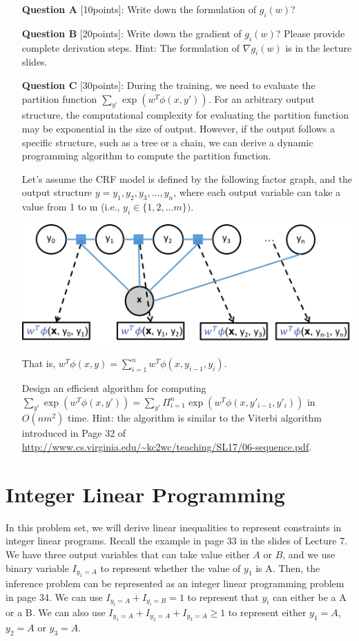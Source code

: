 \begin{itemize}
\item[{\bf Question A}][10points]: Write down the formulation of $g_i(w)$?

\item[ {\bf Question B}][20points]: Write down the gradient of  $g_i(w)$? Please provide complete derivation steps. Hint: The formulation of $\nabla g_i(w)$ is in the lecture slides.



\item[{\bf Question C}][30points]: During the training, we need to evaluate the partition function $\sum_{y'} \exp(w^T\phi(x,y'))$. For an arbitrary output structure, the computational complexity for evaluating the partition function may be exponential in the size of output. However, if the output follows a specific structure, such as a tree or a chain, we can derive a dynamic programming algorithm to compute the partition function.  

Let's assume the CRF model is defined by the following factor graph, and the output structure 
$y=y_1, y_2, y_3, \ldots, y_n$, where each output variable can take a value from 1 to m (i.e., $y_i\in \{1,2,\ldots m\})$.

\includegraphics[width=0.8\linewidth]{factor}

That is, $w^T \phi(x,y) = \sum_{i=1}^{n} w^T\phi(x,y_{i-1}, y_i)$.

Design an efficient algorithm for computing $\sum_{y'} \exp(w^T\phi(x,y')) = \sum_{y'} \Pi_{i=1}^{n} \exp(w^T \phi(x, y'_{i-1}, y'_i))$ in $O(nm^2)$ time. Hint: the algorithm is similar to the Viterbi algorithm introduced in Page 32 of \url{http://www.cs.virginia.edu/~kc2wc/teaching/SL17/06-sequence.pdf}.

\end{itemize}
\section{Integer Linear Programming} 
In this problem set, we will derive linear inequalities to represent constraints in integer linear programs. 
Recall the example in page 33 in the slides of Lecture 7. We have three output variables that can take value either $A$ or $B$, and we use binary variable $I_{y_1=A}$ to represent whether the value of $y_1$ is A. Then, the inference problem can be represented as an integer linear programming problem in page 34.  We can use $I_{y_i=A}+I_{y_i=B}=1$ to represent that $y_i$ can either be a A or a B. We can also use $I_{y_1=A}+I_{y_2=A}+I_{y_3=A}  \geq 1$ to represent either $y_1=A$, $y_2 =A$ or  $y_3 =A$.

